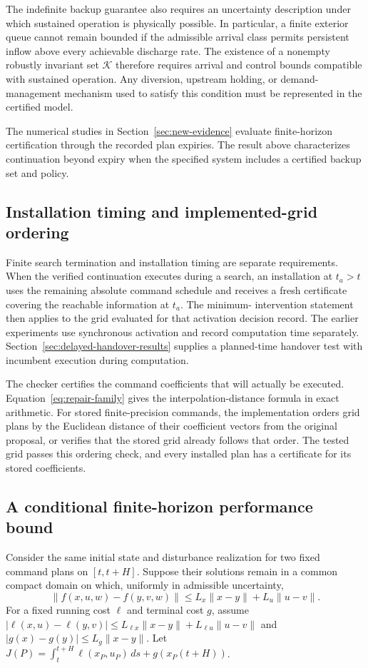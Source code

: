 \documentclass[preprint,12pt]{elsarticle}
\begin{document}
The indefinite backup guarantee also requires an uncertainty description
under which sustained operation is physically possible. In particular, a
finite exterior queue cannot remain bounded if the admissible arrival class
permits persistent inflow above every achievable discharge rate. The existence
of a nonempty robustly invariant set $\mathcal K$ therefore requires arrival
and control bounds compatible with sustained operation. Any diversion,
upstream holding, or demand-management mechanism used to satisfy this
condition must be represented in the certified model.

The numerical studies in Section~\ref{sec:new-evidence} evaluate
finite-horizon certification through the recorded plan expiries. The result
above characterizes continuation beyond expiry when the specified system
includes a certified backup set and policy.

\subsection{Installation timing and implemented-grid ordering}

Finite search termination and installation timing are separate requirements.
When the verified continuation executes during a search, an installation at
$t_a>t$ uses the remaining absolute command schedule and receives a fresh
certificate covering the reachable information at $t_a$. The minimum-
intervention statement then applies to the grid evaluated for that activation
decision record. The earlier experiments use synchronous activation and record computation
time separately. Section~\ref{sec:delayed-handover-results} supplies a
planned-time handover test with incumbent execution during computation.

The checker certifies the command coefficients that will actually be
executed. Equation~\eqref{eq:repair-family} gives the interpolation-distance
formula in exact arithmetic. For stored finite-precision commands, the
implementation orders grid plans by the Euclidean distance of their
coefficient vectors from the original proposal, or verifies that the stored
grid already follows that order. The tested grid passes this ordering check,
and every installed plan has a certificate for its stored coefficients.

\subsection{A conditional finite-horizon performance bound}
Consider the same initial state and disturbance realization for two fixed
command plans on $[t,t+H]$. Suppose their solutions remain in a common
compact domain on which, uniformly in admissible uncertainty,
\[
\|f(x,u,w)-f(y,v,w)\|
\le L_x\|x-y\|+L_u\|u-v\|.
\]
For a fixed running cost $\ell$ and terminal cost $g$, assume
$|\ell(x,u)-\ell(y,v)|\le L_{\ell x}\|x-y\|+
L_{\ell u}\|u-v\|$ and $|g(x)-g(y)|\le L_g\|x-y\|$.
Let $J(P)=\int_t^{t+H}\ell(x_P,u_P)\,ds+g(x_P(t+H))$.
\end{document}
